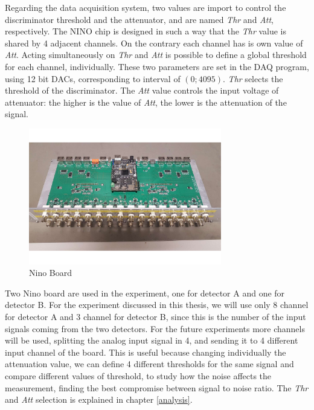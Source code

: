 Regarding the data acquisition system, two values are import to control the discriminator threshold and the attenuator, and are named \textit{Thr} and \textit{Att}, respectively. The NINO chip is designed in such a way that the \textit{Thr} value is shared by 4 adjacent channels. On the contrary each channel has is own value of \textit{Att}. Acting simultaneously on \textit{Thr} and \textit{Att} is possible to define a global threshold for each channel, individually.
These two parameters are set in the DAQ program, using 12 bit DACs, corresponding to interval of $(0 ; 4095)$. \textit{Thr} selects the threshold of the discriminator. The \textit{Att} value controls the input voltage of attenuator: the higher is the value of \textit{Att}, the lower is the attenuation of the signal.

\begin{figure}[hbtp]
\centering
\includegraphics[width = 0.75\textwidth]{ExperimentalSetup/NINO.pdf}
\caption{Nino Board}
\label{fig:NinoBoard}
\end{figure}

Two Nino board are used in the experiment, one for detector A and one for detector B. For the experiment discussed in this thesis, we will use only 8 channel for detector A and 3 channel for detector B, since this is the number of the input signals coming from the two detectors. For the future experiments more channels will be used, splitting the analog input signal in 4, and sending it to 4 different input channel of the board. This is useful because changing individually the attenuation value, we can define 4 different thresholds for the same signal and compare different values of threshold, to study how the noise affects the measurement, finding the best compromise between signal to noise ratio. The \textit{Thr} and \textit{Att} selection is explained in chapter \ref{analysis}.

